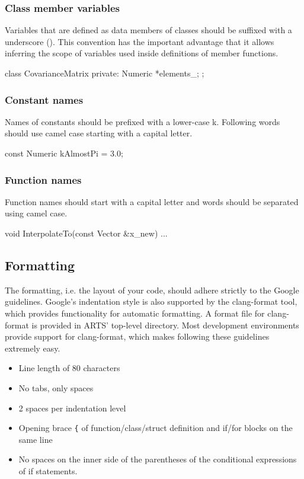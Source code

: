 \subsubsection{Class member variables}

Variables that are defined as data members of classes should be suffixed with
a underscore (\shortcode{\_}). This convention has the important advantage
that it allows inferring the scope of variables used inside definitions of
member functions.

  \begin{code}
  class CovarianceMatrix {
   private:
    Numeric *elements_;
  };
  \end{code}

\subsubsection{Constant names}
Names of constants should be prefixed with a lower-case k. Following words
should use camel case starting with a capital letter.
  \begin{code}
  const Numeric kAlmostPi = 3.0;
  \end{code}

\subsubsection{Function names}
Function names should start with a capital letter and words should
be separated using camel case.

  \begin{code}
  void InterpolateTo(const Vector &x_new) {
    ...
  }
  \end{code}

\subsection{Formatting}

The formatting, i.e. the layout of your code, should adhere strictly to the
Google guidelines. Google's indentation style is also supported by the
clang-format tool, which provides functionality for automatic formatting. A
format file for clang-format is provided in ARTS' top-level directory. Most
development environments provide support for clang-format, which makes following
these guidelines extremely easy.

\begin{itemize}
  \item Line length of 80 characters
  \item No tabs, only spaces
  \item 2 spaces per indentation level
  \item Opening brace \texttt{\{} of function/class/struct definition and if/for blocks on the same line
  \item No spaces on the inner side of the parentheses of the conditional
    expressions of if statements.
\end{itemize}

